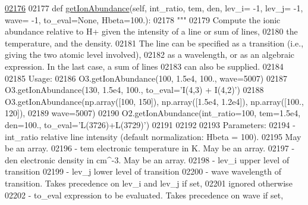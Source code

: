 \begin{DoxyCode}
\hypertarget{classpyneb_1_1core_1_1pynebcore_1_1_atom_l02176}{}\hyperlink{classpyneb_1_1core_1_1pynebcore_1_1_atom_a95230eab8816f670306adceffe6f6a48}{02176} 
02177     \textcolor{keyword}{def }\hyperlink{classpyneb_1_1core_1_1pynebcore_1_1_atom_a95230eab8816f670306adceffe6f6a48}{getIonAbundance}(self, int\_ratio, tem, den, lev\_i= -1, lev\_j= -1, wave= -1, 
      to\_eval=None, Hbeta=100.):
02178         \textcolor{stringliteral}{"""}
02179 \textcolor{stringliteral}{        Compute the ionic abundance relative to H+ given the intensity of a line or sum of lines, }
02180 \textcolor{stringliteral}{        the temperature, and the density. }
02181 \textcolor{stringliteral}{        The line can be specified as a transition (i.e., giving the two atomic level involved), }
02182 \textcolor{stringliteral}{        as a wavelength, or as an algebraic expression. In the last case, a sum of lines }
02183 \textcolor{stringliteral}{        can also be supplied.}
02184 \textcolor{stringliteral}{}
02185 \textcolor{stringliteral}{        Usage:}
02186 \textcolor{stringliteral}{            O3.getIonAbundance(100, 1.5e4, 100., wave=5007)}
02187 \textcolor{stringliteral}{            O3.getIonAbundance(130, 1.5e4, 100., to\_eval='I(4,3) + I(4,2)')}
02188 \textcolor{stringliteral}{            O3.getIonAbundance(np.array([100, 150]), np.array([1.5e4, 1.2e4]), np.array([100., 120]), }
02189 \textcolor{stringliteral}{                wave=5007)}
02190 \textcolor{stringliteral}{            O2.getIonAbundance(int\_ratio=100, tem=1.5e4, den=100., to\_eval='L(3726)+L(3729)')}
02191 \textcolor{stringliteral}{}
02192 \textcolor{stringliteral}{            }
02193 \textcolor{stringliteral}{        Parameters:}
02194 \textcolor{stringliteral}{            - int\_ratio    relative line intensity (default normalization: Hbeta = 100). }
02195 \textcolor{stringliteral}{                            May be an array.}
02196 \textcolor{stringliteral}{            - tem          electronic temperature in K. May be an array.}
02197 \textcolor{stringliteral}{            - den          electronic density in cm^-3. May be an array.}
02198 \textcolor{stringliteral}{            - lev\_i        upper level of transition}
02199 \textcolor{stringliteral}{            - lev\_j        lower level of transition}
02200 \textcolor{stringliteral}{            - wave         wavelength of transition. Takes precedence on lev\_i and lev\_j if set, }
02201 \textcolor{stringliteral}{                            ignored otherwise }
02202 \textcolor{stringliteral}{            - to\_eval      expression to be evaluated. Takes precedence on wave if set, }

\end{DoxyCode}
